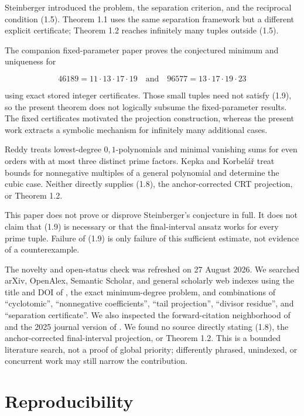 \documentclass[11pt]{article}
\numberwithin{equation}{section}
\begin{document}
Steinberger \cite{steinberger2012} introduced the problem, the separation criterion, and the
reciprocal condition (1.5). Theorem 1.1 uses the same separation framework
but a different explicit certificate; Theorem 1.2 reaches infinitely many
tuples outside (1.5).

The companion fixed-parameter paper \cite{carptopus2026} proves the conjectured minimum and
uniqueness for

\nopagebreak[4]
\[
46189=11\cdot13\cdot17\cdot19
\quad\text{and}\quad
96577=13\cdot17\cdot19\cdot23
\]

using exact stored integer certificates. Those small tuples need not satisfy
(1.9), so the present theorem does not logically subsume the fixed-parameter
results. The fixed certificates motivated the projection construction,
whereas the present work extracts a symbolic mechanism for infinitely many
additional cases.

Reddy \cite{reddy2011} treats lowest-degree \(0,1\)-polynomials and minimal vanishing sums
for even orders with at most three distinct prime factors. Kepka and
Korbel\'a\v{r} \cite{kepkakorbelar2012} treat bounds for nonnegative multiples of a general polynomial
and determine the cubic case. Neither directly supplies (1.8), the
anchor-corrected CRT projection, or Theorem 1.2.

This paper does not prove or disprove Steinberger's conjecture in full. It
does not claim that (1.9) is necessary or that the final-interval ansatz works
for every prime tuple. Failure of (1.9) is only failure of this sufficient
estimate, not evidence of a counterexample.

The novelty and open-status check was refreshed on 27 August 2026. We
searched arXiv, OpenAlex, Semantic Scholar, and general scholarly web indexes
using the title and DOI of \cite{steinberger2012}, the exact minimum-degree problem, and
combinations of ``cyclotomic'', ``nonnegative coefficients'', ``tail projection'',
``divisor residue'', and ``separation certificate''. We also inspected the
forward-citation neighborhood of \cite{steinberger2012} and the 2025 journal version of \cite{labazakharov2025}.
We found no source directly stating (1.8), the anchor-corrected final-interval
projection, or Theorem 1.2. This is a bounded literature search, not a proof
of global priority; differently phrased, unindexed, or concurrent work may
still narrow the contribution.

\section{Reproducibility}
\end{document}
